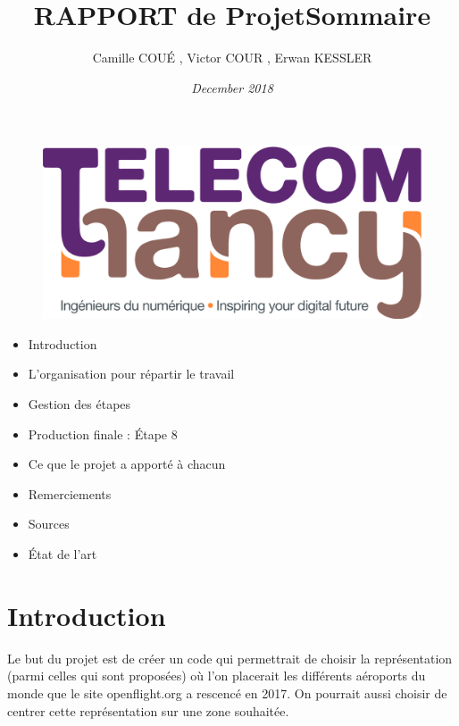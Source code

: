 \documentclass{article}
\begin{document}
\begin{figure}
\centering
\includegraphics[scale=0.1]{logo_TNCY.png}
\label{fig:logo_tncy}
\end{figure}

\title{\bf RAPPORT de Projet}
\author{ Camille COUÉ , Victor COUR , Erwan KESSLER}
\date{\it December 2018}

\maketitle


\title{\bf \Large Sommaire}
\begin{itemize}
    \item Introduction
    \item L'organisation pour répartir le travail 
    \item Gestion des étapes
    \item Production finale : Étape 8
    \item Ce que le projet a apporté à chacun
    \item Remerciements
    \item Sources
    \item État de l'art
\end{itemize}
\section { Introduction }



Le but du projet est de créer un code qui permettrait de choisir la représentation (parmi celles qui sont proposées) où l’on placerait les différents aéroports du monde que le site openflight.org a rescencé en 2017. On pourrait aussi choisir de centrer cette représentation sur une zone souhaitée.

\vspace{1\baselineskip}
\end{document}
